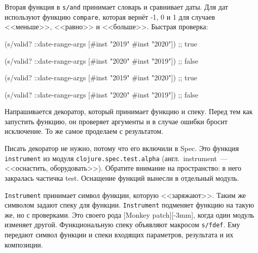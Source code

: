 \fi


Вторая функция в \verb|s/and| принимает словарь и сравнивает даты. Для дат
используют функцию \verb|compare|, которая вернёт -1, 0 и 1 для случаев
<<меньше>>, <<равно>> и <<больше>>. Быстрая проверка:

\ifx\DEVICETYPE\MOBILE

\begin{english}
  \begin{clojure}
(s/valid? ::date-range-args
          [#inst "2019" #inst "2020"])
;; true

(s/valid? ::date-range-args
          [#inst "2020" #inst "2019"])
;; false
  \end{clojure}
\end{english}

\else

\begin{english}
  \begin{clojure}
(s/valid? ::date-range-args
          [#inst "2019" #inst "2020"]) ;; true

(s/valid? ::date-range-args
          [#inst "2020" #inst "2019"]) ;; false
  \end{clojure}
\end{english}

\fi


Напрашивается декоратор, который принимает функцию и спеку. Перед тем как
запустить функцию, он проверяет аргументы и в случае ошибки бросит исключение. То
же самое проделаем с результатом.


Писать декоратор не нужно, потому что его включили в Spec. Это функция
\verb|instrument| из модуля \verb|clojure.spec.test.alpha|
(англ.~instru\-ment~--- <<оснастить, оборудовать>>). Обратите внимание на пространство:
в него закралась частичка test. Оснащение функций вынесли в отдельный
модуль.


\verb|Instrument| принимает символ функции, которую <<заряжают>>. Таким же
символом задают спеку для функции. \verb|Instrument| подменяет функцию на
такую же, но с проверками. Это своего рода [Monkey patch][-3mm], когда один модуль изменяет другой. Функциональную спеку объявляют макросом \verb|s/fdef|.
Ему передают символ функции и спеки входящих параметров, результата и их композиции.

